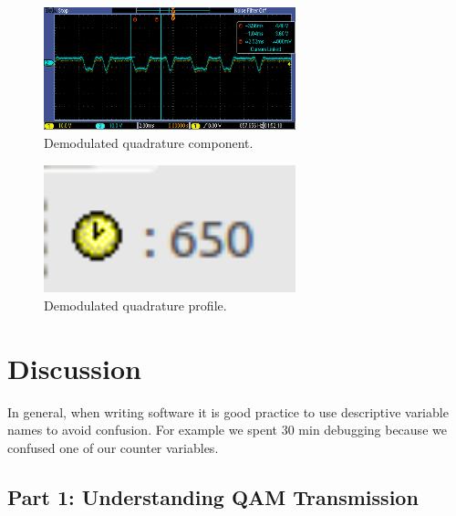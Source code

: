 \documentclass{article}
\begin{document}
\begin{figure}[h]
  \begin{center}
    \includegraphics[width=0.65\textwidth]{img/task_2_c_oscilloscope.png}
    \caption{Demodulated quadrature component.}
  \end{center}
\end{figure}

\begin{figure}[h]
  \begin{center}
    \includegraphics[width=0.65\textwidth]{img/task_2_c_profile.png}
    \caption{Demodulated quadrature profile.}
  \end{center}
\end{figure}

\pagebreak


\section{Discussion}

In general, when writing software it is good practice to use descriptive variable names to avoid confusion.
For example we spent 30 min debugging because we confused one of our counter variables.

\subsection{Part 1: Understanding QAM Transmission}
\end{document}
